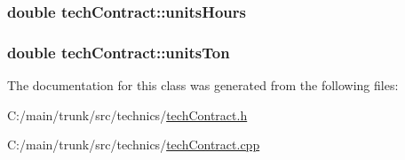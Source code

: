 \label{classtech_contract_a615d6a868249343b35dfc8b65b0760d5}
\hypertarget{classtech_contract_a3b4ef6c2c518af353ee50e34330f7f7b}{
\subsubsection[{unitsHours}]{\setlength{\rightskip}{0pt plus 5cm}double {\bf techContract::unitsHours}}}
\label{classtech_contract_a3b4ef6c2c518af353ee50e34330f7f7b}
\hypertarget{classtech_contract_af0b9071cc8e4057c7d6d90e2482ffb4d}{
\subsubsection[{unitsTon}]{\setlength{\rightskip}{0pt plus 5cm}double {\bf techContract::unitsTon}}}
\label{classtech_contract_af0b9071cc8e4057c7d6d90e2482ffb4d}


The documentation for this class was generated from the following files:\begin{DoxyCompactItemize}
\item 
C:/main/trunk/src/technics/\hyperlink{tech_contract_8h}{techContract.h}\item 
C:/main/trunk/src/technics/\hyperlink{tech_contract_8cpp}{techContract.cpp}\end{DoxyCompactItemize}
